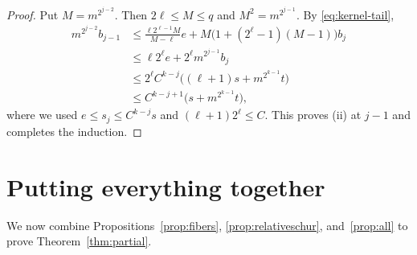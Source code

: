 \documentclass[11pt,reqno]{amsart}
\theoremstyle{plain}
\theoremstyle{definition}
\begin{document}
\begin{proof}
Put $M=m^{2^{j-2}}$. Then $2\ell\leq M\leq q$ and
$M^2=m^{2^{j-1}}$. By \eqref{eq:kernel-tail},
\begin{align*}
 m^{2^{j-2}}b_{j-1}
 &\leq \frac{\ell 2^{\ell-1}M}{M-\ell}e
       +M\bigl(1+(2^\ell-1)(M-1)\bigr)b_j\\
 &\leq \ell 2^\ell e+2^\ell m^{2^{j-1}}b_j\\
 &\leq 2^\ell C^{k-j}\bigl((\ell+1)s+m^{2^{k-1}}t\bigr)\\
 &\leq C^{k-j+1}\bigl(s+m^{2^{k-1}}t\bigr),
\end{align*}
where we used $e\leq s_j\leq C^{k-j}s$ and $(\ell+1)2^\ell\leq C$.
This proves \textup{(ii)} at $j-1$ and completes the induction.
\end{proof}
\section{Putting everything together}\label{sec:main}
We now combine Propositions~\ref{prop:fibers}, \ref{prop:relativeschur}, and~\ref{prop:all} to prove Theorem~\ref{thm:partial}.
\end{document}
